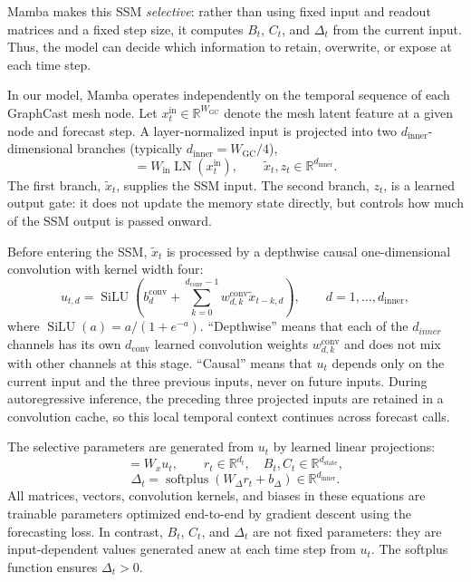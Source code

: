 \documentclass{article}
\begin{document}
Mamba makes this SSM \emph{selective}: rather than using fixed input and readout matrices and a fixed step size, it computes $B_t$, $C_t$, and $\Delta_t$ from the current input. Thus, the model can decide which information to retain, overwrite, or expose at each time step.

In our model, Mamba operates independently on the temporal sequence of each GraphCast mesh node. Let $x_t^{\mathrm{in}}\in\mathbb{R}^{W_{\textrm{GC}}}$ denote the mesh latent feature at a given node and forecast step. A layer-normalized input is projected into two $d_{\textrm{inner}}$-dimensional branches (typically $d_{\textrm{inner}}=W_{\textrm{GC}}/4$),
\begin{equation}
    [\tilde{x}_t,z_t]
    =
    W_{\mathrm{in}}\operatorname{LN}(x_t^{\mathrm{in}}),
    \qquad
    \tilde{x}_t,z_t\in\mathbb{R}^{d_{\textrm{inner}}}.
\end{equation}
The first branch, $\tilde{x}_t$, supplies the SSM input. The second branch, $z_t$, is a learned output gate: it does not update the memory state directly, but controls how much of the SSM output is passed onward.

Before entering the SSM, $\tilde{x}_t$ is processed by a depthwise causal one-dimensional convolution with kernel width four:
\begin{equation}
    u_{t,d}
    =
    \operatorname{SiLU}
    \left(
        b^{\mathrm{conv}}_d
        +
        \sum_{k=0}^{d_{\textrm{conv}}-1}
        w^{\mathrm{conv}}_{d,k}\tilde{x}_{t-k,d}
    \right),
    \qquad d=1,\ldots, d_{\textrm{inner}},
\end{equation}
where $\operatorname{SiLU}(a)=a/(1+e^{-a})$. ``Depthwise'' means that each of the $d_{inner}$ channels has its own $d_{\textrm{conv}}$ learned convolution weights $w^{\mathrm{conv}}_{d,k}$ and does not mix with other channels at this stage. ``Causal'' means that $u_t$ depends only on the current input and the three previous inputs, never on future inputs. During autoregressive inference, the preceding three projected inputs are retained in a convolution cache, so this local temporal context continues across forecast calls.

The selective parameters are generated from $u_t$ by learned linear projections:
\begin{equation}
    [r_t,B_t,C_t] = W_xu_t,
    \qquad
    r_t\in\mathbb{R}^{d_t},
    \quad
    B_t,C_t\in\mathbb{R}^{d_{\textrm{state}}},
\end{equation}
\begin{equation}
    \Delta_t
    =
    \operatorname{softplus}(W_\Delta r_t+b_\Delta)
    \in\mathbb{R}^{d_{\textrm{inner}}}.
\end{equation}
All matrices, vectors, convolution kernels, and biases in these equations are trainable parameters optimized end-to-end by gradient descent using the forecasting loss. In contrast, $B_t$, $C_t$, and $\Delta_t$ are not fixed parameters: they are input-dependent values generated anew at each time step from $u_t$. The softplus function ensures $\Delta_t>0$.
\end{document}
